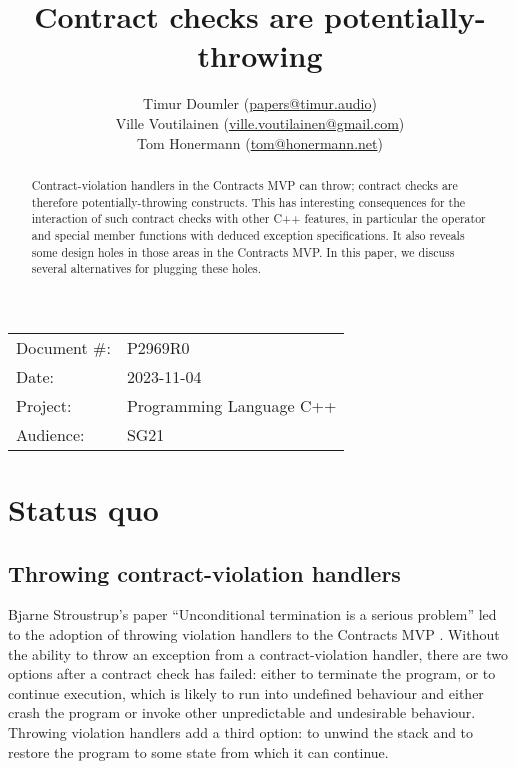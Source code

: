 


\title{Contract checks are potentially-throwing}
\author{ Timur Doumler \small(\href{mailto:papers@timur.audio}{papers@timur.audio}) \\
Ville Voutilainen \small(\href{mailto:ville.voutilainen@gmail.com}{ville.voutilainen@gmail.com}) \\
Tom Honermann \small(\href{mailto:tom@honermann.net}{tom@honermann.net})
}
\date{}
\maketitle


\begin{tabular}{ll}
Document \#: & P2969R0 \\
Date: &2023-11-04 \\
Project: & Programming Language C++ \\
Audience: & SG21
\end{tabular}

\begin{abstract}
Contract-violation handlers in the Contracts MVP can throw; contract checks are therefore potentially-throwing constructs. This has interesting consequences for the interaction of such contract checks with other C++ features, in particular the  operator and special member functions with deduced exception specifications. It also reveals some design holes in those areas in the Contracts MVP. In this paper, we discuss several alternatives for plugging these holes.
\end{abstract}



\section{Status quo}
\subsection{Throwing contract-violation handlers}

Bjarne Stroustrup's paper ``Unconditional termination is a serious problem'' \cite{P2698R0} led to the adoption of throwing violation handlers to the Contracts MVP \cite{P2900R1}. Without the ability to throw an exception from a contract-violation handler, there are two options after a contract check has failed: either to terminate the program, or to continue execution, which is likely to run into undefined behaviour and either crash the program or invoke other unpredictable and undesirable behaviour. Throwing violation handlers add a third option: to unwind the stack and to restore the program to some state from which it can continue.

